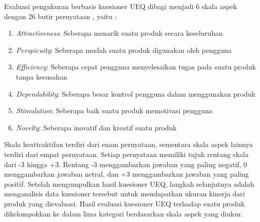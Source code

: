 Evaluasi pengukuran berbasis kuesioner UEQ dibagi menjadi 6 skala aspek 
dengan 26 butir pernyataan , yaitu :
\begin{enumerate}
	\item \textit{Attractiveness}: Seberapa menarik suatu produk secara keseluruhan 
	\item \textit{Perspicuity}:  Seberapa mudah suatu produk digunakan oleh pengguna 
	\item \textit{Efficiency}: Seberapa cepat pengguna menyelesaikan tugas pada suatu produk tanpa kesusahan 
	\item \textit{Dependability}: Seberapa besar kontrol pengguna dalam menggunakan produk  
	\item \textit{Stimulation}: Seberapa baik suatu produk memotivasi pengguna 
	\item \textit{Novelty}: Seberapa inovatif dan kreatif suatu produk 
\end{enumerate}
Skala keattraktifan terdiri dari enam pernyataan, sementara skala aspek lainnya terdiri dari empat pernyataan. Setiap pernyataan memiliki tujuh rentang skala dari -3 hingga +3. Rentang -3 menggambarkan jawaban yang paling negatif, 0 menggambarkan jawaban netral, dan +3 menggambarkan jawaban yang paling positif.
Setelah mengumpulkan hasil kuesioner UEQ, langkah selanjutnya adalah menganalisis data kuesioner tersebut untuk mendapatkan ukuran kinerja dari produk yang dievaluasi. Hasil evaluasi kuesioner UEQ terhadap suatu produk dikelompokkan ke dalam lima kategori berdasarkan skala aspek yang diukur.


